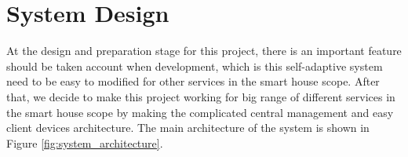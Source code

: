 \section{System Design}
\label{sec:system_design} %





\par At the design and preparation stage for this project, there is an important feature should be taken account when development, which is this self-adaptive system need to be easy to modified for other services in the smart house scope. After that, we decide to make this project working for big range of different services in the smart house scope by making the complicated central management and easy client devices architecture. The main architecture of the system is shown in Figure \ref{fig:system_architecture}.


